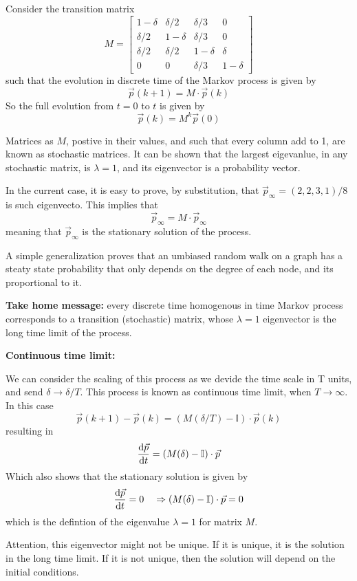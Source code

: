 Consider the transition matrix
\[
M = \begin{bmatrix}
1-\delta & \delta/2 & \delta/3 & 0\\
\delta/2 & 1-\delta & \delta/3 & 0\\
\delta/2 & \delta/2 & 1-\delta & \delta\\
0 & 0 & \delta/3 & 1-\delta
\end{bmatrix}\]
such that the evolution in discrete time of the Markov process is given by
\[ \vec p(k+1) = M \cdot \vec p(k) \]
So the full evolution from $t=0$ to $t$ is given by
\[ \vec p (k) = M^k \vec p(0)\]

Matrices as $M$, postive in their values, and such that every column add to 1, are known as stochastic matrices. It can be shown that the largest eigevanlue, in any stochastic matrix, is $\lambda = 1$, and its  eigenvector is a probability vector.

In the current case, it is easy to prove, by substitution, that $\vec p_\infty = (2,2,3,1)/8$ is such eigenvecto. This implies that
\[ \vec p_\infty = M\cdot \vec p_\infty\]
meaning that $\vec p_\infty$ is the stationary solution of the process.

A simple generalization proves that an umbiased random walk on a graph has a steaty state probability that only depends on the degree of each node, and its proportional to it.

{\bf Take home message:} every discrete time homogenous in time Markov process corresponds to a transition (stochastic) matrix, whose $\lambda=1$ eigenvector is the long time limit of the process.

{\bf Continuous time limit:}

We can consider the scaling of this process as we devide the time scale in T units, and send $\delta \to \delta / T$. This process is known as continuous time limit, when $T\to \infty$. In this case
\[  \vec p(k+1) - \vec p(k) = \left( M(\delta/T) - \mathbb{I}\right) \cdot \vec  p(k)\]
resulting in 
\[ \frac {\mathrm{d} \vec p}{\mathrm{d} t}  =  \left(M(\delta)-\mathbb I \right) \cdot \vec p\]
Which also shows that the stationary solution is given by 
\[ \frac {\mathrm{d} \vec p}{\mathrm{d} t}  = 0 \quad  \Rightarrow   \left(M(\delta)-\mathbb I \right) \cdot \vec p = 0\]
which is the defintion of the eigenvalue $\lambda = 1$ for matrix $M$.

Attention, this eigenvector might not be unique. If it is unique, it is the solution in the long time limit. If it is not unique, then the solution will depend on the initial conditions.


